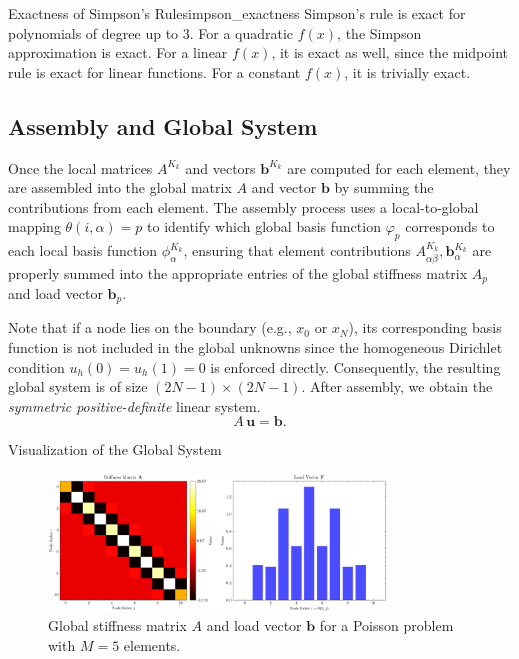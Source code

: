 \documentclass[a4paper,10pt]{article}
\begin{document}
\begin{remark}{Exactness of Simpson's Rule}{simpson_exactness}
	Simpson's rule is exact for polynomials of degree up to 3. 
	For a quadratic \(f(x)\), the Simpson approximation is exact. 
	For a linear \(f(x)\), it is exact as well, since the midpoint rule is exact for linear functions. For a constant \(f(x)\), it is trivially exact.
\end{remark}

\subsection{Assembly and Global System}

Once the local matrices \(A^{K_k}\) and vectors \(\symbf{b}^{K_k}\) are computed for each element, they are assembled into the global matrix \(A\) and vector \(\mathbf{b}\) by summing the contributions from each element. 
The assembly process uses a local-to-global mapping \(\theta(i,\alpha)=p\) to identify which global basis function \(\varphi_p\) corresponds to each local basis function \(\phi_\alpha^{K_k}\), ensuring that element contributions \(A^{K_k}_{\alpha\beta}, \symbf{b}^{K_k}_\alpha\) are properly summed into the appropriate entries of the global stiffness matrix  \(A_p\) and load vector \(\mathbf{b}_p\).

Note that if a node lies on the boundary (e.g., \(x_0\) or \(x_N\)), its corresponding basis function is not included in the global unknowns since the homogeneous Dirichlet condition \(u_h(0)=u_h(1)=0\) is enforced directly. 
Consequently, the resulting global system is of size \((2N-1) \times (2N-1)\). After assembly, we obtain the \emph{symmetric positive-definite} linear system.
\[
	A\,\mathbf{u} = \mathbf{b}.
\]
\begin{example}{Visualization of the Global System}{}
	\begin{figure}[H]
		\centering
		\includegraphics[width=0.8\textwidth]{figures/stiffness_load_sine_M5.png}
		\caption{Global stiffness matrix \(A\) and load vector \(\mathbf{b}\) for a Poisson problem with \(M=5\) elements.}
		\label{fig:stiffness_load}
	\end{figure}
\end{example}
\end{document}
